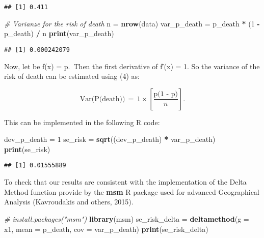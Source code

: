 \documentclass[]{article}
\newenvironment{Shaded}{\begin{snugshade}}{\end{snugshade}}
\newcommand{\CommentTok}[1]{\textcolor[rgb]{0.56,0.35,0.01}{\textit{#1}}}
\newcommand{\DataTypeTok}[1]{\textcolor[rgb]{0.13,0.29,0.53}{#1}}
\newcommand{\DecValTok}[1]{\textcolor[rgb]{0.00,0.00,0.81}{#1}}
\newcommand{\KeywordTok}[1]{\textcolor[rgb]{0.13,0.29,0.53}{\textbf{#1}}}
\newcommand{\NormalTok}[1]{#1}
\newcommand{\OperatorTok}[1]{\textcolor[rgb]{0.81,0.36,0.00}{\textbf{#1}}}
\newcommand{\StringTok}[1]{\textcolor[rgb]{0.31,0.60,0.02}{#1}}
\begin{document}
\begin{verbatim}
## [1] 0.411
\end{verbatim}

\begin{Shaded}
\begin{Highlighting}[]
\CommentTok{# Varianze for the risk of death}
\NormalTok{ n =}\StringTok{ }\KeywordTok{nrow}\NormalTok{(data)}
\NormalTok{ var_p_death =}\StringTok{ }\NormalTok{p_death }\OperatorTok{*}\StringTok{ }\NormalTok{(}\DecValTok{1} \OperatorTok{-}\StringTok{ }\NormalTok{p_death) }\OperatorTok{/}\StringTok{ }\NormalTok{n}
 \KeywordTok{print}\NormalTok{(var_p_death)}
\end{Highlighting}
\end{Shaded}

\begin{verbatim}
## [1] 0.000242079
\end{verbatim}

Now, let be f(x) = p.~Then the first derivative of f′(x) = 1. So the
variance of the risk of death can be estimated using (4) as:

\[\text{Var(P(death))}\,=\,1\times\left[\frac{\text{p(1 - p)}}{n}\right].\]

This can be implemented in the following R code:

\begin{Shaded}
\begin{Highlighting}[]
\NormalTok{dev_p_death =}\StringTok{ }\DecValTok{1}
\NormalTok{se_risk =}\StringTok{ }\KeywordTok{sqrt}\NormalTok{((dev_p_death) }\OperatorTok{*}\StringTok{ }\NormalTok{var_p_death)}
\KeywordTok{print}\NormalTok{(se_risk)}
\end{Highlighting}
\end{Shaded}

\begin{verbatim}
## [1] 0.01555889
\end{verbatim}

To check that our results are consistent with the implementation of the
Delta Method function provide by the \textbf{msm} R package used for
advanced Geographical Analysis (Kavroudakis and others, 2015).

\begin{Shaded}
\begin{Highlighting}[]
\CommentTok{# install.packages("msm")}
\KeywordTok{library}\NormalTok{(msm)}
\NormalTok{se_risk_delta =}\StringTok{ }\KeywordTok{deltamethod}\NormalTok{(}\DataTypeTok{g =} \OperatorTok{~}\StringTok{ }\NormalTok{x1, }
                            \DataTypeTok{mean =}\NormalTok{ p_death,         }
                            \DataTypeTok{cov  =}\NormalTok{ var_p_death)}
\KeywordTok{print}\NormalTok{(se_risk_delta)}
\end{Highlighting}
\end{Shaded}
\end{document}
